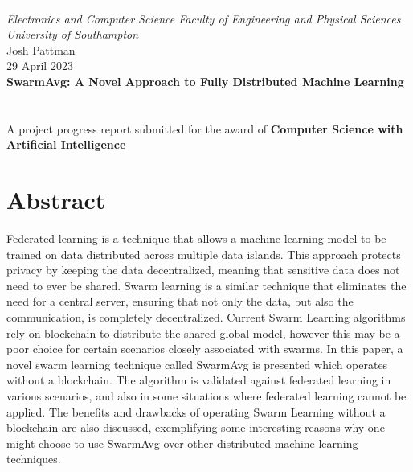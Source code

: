 \documentclass[12pt,a4paper,twoside]{report}
\author{Josh Pattman}
\begin{document}
	
	\begin{titlepage}
		\textcolor{white}{.}\\[2.2cm]
		\centering\Large\emph{Electronics and Computer Science Faculty of Engineering and Physical Sciences University of Southampton}
		\\[2cm]
		\centering\Large{Josh Pattman} \\
		\centering\Large{29 April 2023} \\
		\centering\huge\textbf{SwarmAvg: A Novel Approach to Fully Distributed Machine Learning}
		\\[2cm]
		 \\[1cm]
		\\[2cm]
		\centering\Large{A project progress report submitted for the award of \textbf{Computer Science with Artificial Intelligence}}
	\end{titlepage}
	
	\chapter*{Abstract}
	Federated learning is a technique that allows a machine learning model to be trained on data distributed across multiple data islands. This approach protects privacy by keeping the data decentralized, meaning that sensitive data does not need to ever be shared. Swarm learning is a similar technique that eliminates the need for a central server, ensuring that not only the data, but also the communication, is completely decentralized. Current Swarm Learning algorithms rely on blockchain to distribute the shared global model, however this may be a poor choice for certain scenarios closely associated with swarms. In this paper, a novel swarm learning technique called SwarmAvg is presented which operates without a blockchain. The algorithm is validated against federated learning in various scenarios, and also in some situations where federated learning cannot be applied. The benefits and drawbacks of operating Swarm Learning without a blockchain are also discussed, exemplifying some interesting reasons why one might choose to use SwarmAvg over other distributed machine learning techniques.
	
\end{document}

